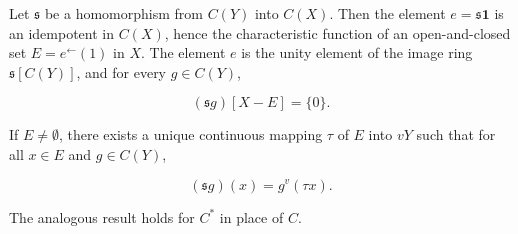 Let $\mathfrak{s}$ be a homomorphism from $C(Y)$ into $C(X)$. Then the element $e = \mathfrak{s}\mathbf{1}$ is an idempotent in $C(X)$, hence the characteristic function of an open-and-closed set $E = e^{\leftarrow}(1)$ in $X$. The element $e$ is the unity element of the image ring $\mathfrak{s}[C(Y)]$, and for every $g \in C(Y)$,

$$(\mathfrak{s}g)[X - E] = \{0\}.$$

If $E \neq \emptyset$, there exists a unique continuous mapping $\tau$ of $E$ into $vY$ such that for all $x \in E$ and $g \in C(Y)$,

$$(\mathfrak{s}g)(x) = g^v(\tau x).$$

The analogous result holds for $C^*$ in place of $C$.
